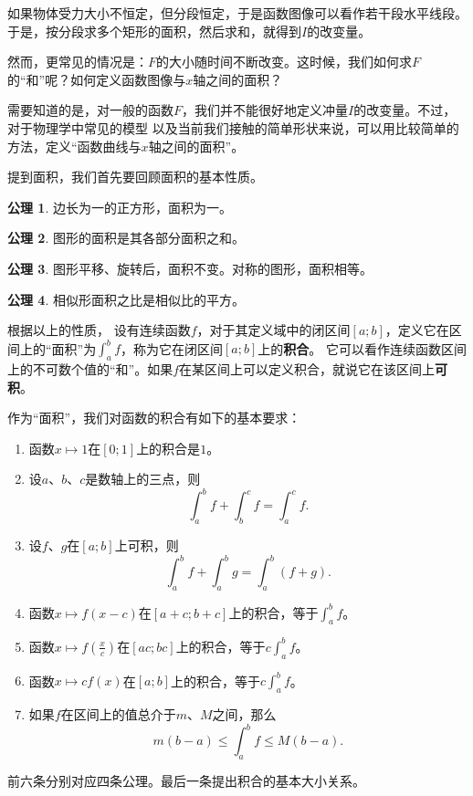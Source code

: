 \documentclass[12pt,UTF8]{ctexbook}
\theoremstyle{definition}
\newtheorem*{po}{公理}
\theoremstyle{plain}
\begin{document}
如果物体受力大小不恒定，但分段恒定，于是函数图像可以看作若干段水平线段。
于是，按分段求多个矩形的面积，然后求和，就得到$I$的改变量。

然而，更常见的情况是：$F$的大小随时间不断改变。这时候，我们如何求$F$的“和”呢？如何定义函数图像与$x$轴之间的面积？

需要知道的是，对一般的函数$F$，我们并不能很好地定义冲量$I$的改变量。不过，对于物理学中常见的模型
以及当前我们接触的简单形状来说，可以用比较简单的方法，定义“函数曲线与$x$轴之间的面积”。

提到面积，我们首先要回顾面积的基本性质。

\begin{po}
    边长为一的正方形，面积为一。
\end{po}

\begin{po}
    图形的面积是其各部分面积之和。
\end{po}

\begin{po}
    图形平移、旋转后，面积不变。对称的图形，面积相等。
\end{po}

\begin{po}
    相似形面积之比是相似比的平方。
\end{po}

根据以上的性质，
设有连续函数$f$，对于其定义域中的闭区间$[a; b]$，定义它在区间上的“面积”为$\int_a^b f$，称为它在闭区间$[a; b]$上的\textbf{积合}。
它可以看作连续函数区间上的不可数个值的“和”。如果$f$在某区间上可以定义积合，就说它在该区间上\textbf{可积}。

作为“面积”，我们对函数的积合有如下的基本要求：

\begin{enumerate}
    \item 函数$x\mapsto 1$在$[0;1]$上的积合是$1$。
    \item 设$a$、$b$、$c$是数轴上的三点，则
        $$\int_a^b f + \int_b^c f = \int_a^c f.$$
    \item 设$f$、$g$在$[a; b]$上可积，则
        $$ \int_a^b f + \int_a^b g = \int_a^b (f + g). $$
    \item 函数$x\mapsto f(x-c)$在$[a+c;b+c]$上的积合，等于$\int_a^b f$。
    \item 函数$x\mapsto f\left(\frac{x}{c}\right)$在$[ac; bc]$上的积合，等于$c\int_a^b f$。
    \item 函数$x\mapsto cf(x)$在$[a; b]$上的积合，等于$c\int_a^b f$。
    \item 如果$f$在区间上的值总介于$m$、$M$之间，那么
        $$m(b - a) \leqslant \int_a^b f \leqslant M(b - a).$$
\end{enumerate}
前六条分别对应四条公理。最后一条提出积合的基本大小关系。
\end{document}

